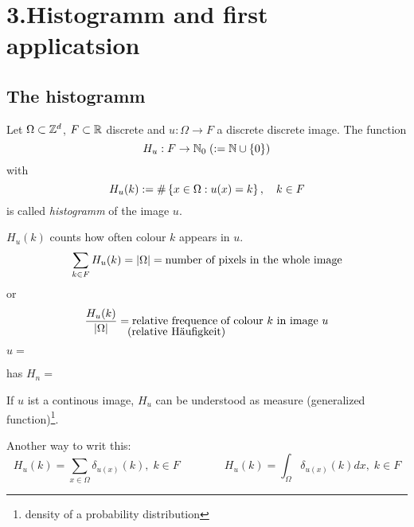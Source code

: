 \chapter{3.Histogramm and first applicatsion}
\section{The histogramm}
%
%
\begin{definition}[histogram]
	Let $\Omega \subset \mathbb{Z}^d$, $F\subset \mathbb{R}$ discrete and 
 	$u: \Omega \to F$ a discrete discrete image. 
 	The function 
 		$$ H_u : F \to \mathbb{N}_0 \; (:= \mathbb{N} \cup \left\{0\right\})$$
 	with 
	$$ H_u (k) := \# \left\{ x\in \Omega: 
		u(x) = k\right\}, \quad k\in F$$
	is called \emph{histogramm} of the image $u$.
\end{definition}

%
%
$H_u(k)$ counts how often colour $k$ appears in $u$.
%
	$$ \sum_{k\in F} H_u (k) = |\Omega| 
		= \hbox{number of pixels in the whole  image}$$
or
%
	$$ {H_u(k) \over |\Omega|} = 
		\hbox{relative frequence$%
			_{\lower0.84em\hbox{\hskip-8.1em (relative Häufigkeit)}}$ 
				 \hskip-.8em \hbox{of colour $k$ in image $u$}} $$

%
%
\newcommand{\pikA}{%
	\begin{minipage}{0.14\linewidth}
		\tikzpictureQNINEONE
	\end{minipage}%
}
\newcommand{\pikB}{%
	\begin{minipage}{0.35\linewidth}
		\tikzpictureQNINETWO
	\end{minipage}%
}

\begin{bsp}
	$u =$ \pikA has $H_n =$ \pikB  
\end{bsp}

If $u$ ist a continous image, $H_u$ can be understood as
measure (generalized function)\footnote{density
of a probability distribution}. 

\newcommand{\underarrow}[2]{%
	\newlength{\widthA}
	\newlength{\widthB}
	\settowidth{\widthA}{#1}
	\settowidth{\widthB}{#2}
	\vbox{1\widthA}{#1\\ \hskip-2em\parbox{\widthB}{$\uparrow$\\#2}}
}
{\small 
	Another way to writ this:
	\[ H_u(k) = \sum_{x\in \Omega} 
	\delta _{u(x)}(k),\;
		k \in F \qquad \qquad
		H_u (k) = \int_{\Omega} \delta_{u(x)}(k) dx, \;
		k\in F\]
}


